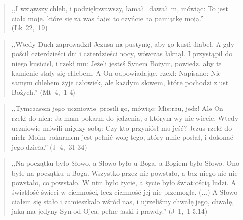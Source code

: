 \documentclass[10pt,a4paper,oneside]{article}
\begin{document}
\begin{quote}
,,I wziąwszy chleb, i podziękowawszy, łamał i dawał im, mówiąc: To jest ciało moje, które się za was daje; to czyńcie na pamiątkę moją.'' (Łk~22,~19)
\end{quote}
\begin{quote}
,,Wtedy Duch zaprowadził Jezusa na pustynię, aby go kusił diabeł. A gdy pościł czterdzieści dni i czterdzieści nocy, wówczas łaknął. I przystąpił do niego kusiciel, i rzekł mu: Jeżeli jesteś Synem Bożym, powiedz, aby te kamienie stały się chlebem. A On odpowiadając, rzekł: Napisano: Nie samym chlebem żyje człowiek, ale każdym słowem, które pochodzi z ust Bożych.'' (Mt~4,~1-4)
\end{quote}
\begin{quote}
,,Tymczasem jego uczniowie, prosili go, mówiąc: Mistrzu, jedz! Ale On rzekł do nich: Ja mam pokarm do jedzenia, o którym wy nie wiecie. Wtedy uczniowie mówili między sobą: Czy kto przyniósł mu jeść? Jezus rzekł do nich: Moim pokarmem jest pełnić wolę tego, który mnie posłał, i dokonać jego dzieła.'' (J~4,~31-34)
\end{quote}
\begin{quote}
,,Na początku było Słowo, a Słowo było u Boga, a Bogiem było Słowo. Ono było na początku u Boga. Wszystko przez nie powstało, a bez niego nic nie powstało, co powstało. W nim było życie, a życie było światłością ludzi. A światłość świeci w ciemności, lecz ciemność jej nie przemogła. (...) A Słowo ciałem się stało i zamieszkało wśród nas, i ujrzeliśmy chwałę jego, chwałę, jaką ma jedyny Syn od Ojca, pełne łaski i prawdy.'' (J~1,~1-5.14)
\end{quote}
\end{document}

